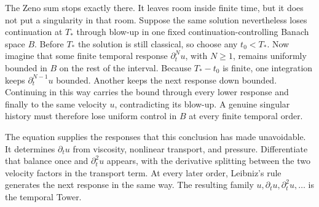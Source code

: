 The Zeno sum stops exactly there.
It leaves room inside finite time, but it does not put a singularity in that room.
Suppose the same solution nevertheless loses continuation at \(T_*\) through blow-up in one fixed continuation-controlling Banach space \(B\).
Before \(T_*\) the solution is still classical, so choose any \(t_0<T_*\).
Now imagine that some finite temporal response \(\partial_t^N u\), with \(N\geq1\), remains uniformly bounded in \(B\) on the rest of the interval.
Because \(T_*-t_0\) is finite, one integration keeps \(\partial_t^{N-1}u\) bounded.
Another keeps the next response down bounded.
Continuing in this way carries the bound through every lower response and finally to the same velocity \(u\), contradicting its blow-up.
A genuine singular history must therefore lose uniform control in \(B\) at every finite temporal order.

The \NavierStokes{} equation supplies the responses that this conclusion has made unavoidable.
It determines \(\partial_tu\) from viscosity, nonlinear transport, and pressure.
Differentiate that balance once and \(\partial_t^2u\) appears, with the derivative splitting between the two velocity factors in the transport term.
At every later order, Leibniz's rule generates the next response in the same way.
The resulting family \(u,\partial_tu,\partial_t^2u,\ldots\) is the temporal Tower.
